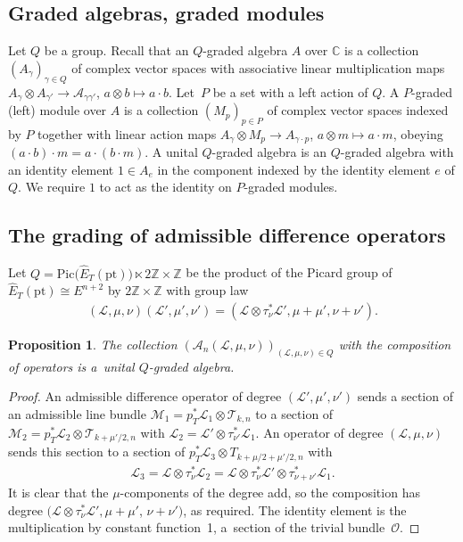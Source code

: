 \documentclass[10pt,a4paper]{amsart}
\numberwithin{equation}{section}
\newtheorem{Proposition}[Theorem]{Proposition}
 { \theoremstyle{definition}
\newtheorem{Definition}[Theorem]{Definition}
\newtheorem{Example}[Theorem]{Example}
\newtheorem{Remark}[Theorem]{Remark} }
\begin{document}
\subsection{Graded algebras, graded modules}
Let $Q$ be a group. Recall that an $Q$-graded algebra $A$ over $\mathbb C$ is a collection $(A_\gamma)_{\gamma\in Q}$ of complex vector spaces with associative linear multiplication maps $A_\gamma\otimes A_{\gamma'}\to\mathcal A_{\gamma\gamma'}$, $a\otimes b\mapsto a\cdot b$. Let~$P$ be a set with a left action of $Q$. A $P$-graded (left) module over $A$ is a collection $(M_p)_{p\in P}$ of complex vector spaces indexed by $P$ together with linear action maps $A_\gamma\otimes M_p\to A_{\gamma\cdot p}$, $a\otimes m\mapsto a\cdot m$, obeying $(a\cdot b)\cdot m=a\cdot(b\cdot m)$. A unital $Q$-graded algebra is an $Q$-graded algebra with an identity element $1\in A_e$ in the component indexed by the identity element $e$ of $Q$. We require $1$ to act as the identity on $P$-graded modules.

\subsection{The grading of admissible difference operators}
Let $Q=\mathrm{Pic}\big(\hat E_T(\mathrm{pt})\big)\ltimes 2\mathbb Z\times \mathbb Z$ be the product of the Picard group of $\hat E_T(\mathrm{pt})\cong E^{n+2}$ by $2\mathbb Z\times \mathbb Z$ with group law
\begin{gather*}
 (\mathcal L,\mu,\nu)(\mathcal L',\mu',\nu') =(\mathcal L\otimes \tau^*_\nu \mathcal L', \mu+\mu',\nu+\nu').
\end{gather*}
\begin{Proposition} The collection $(\mathcal A_n(\mathcal L,\mu,\nu))_{(\mathcal L,\mu,\nu)\in Q}$ with the composition of operators is a~unital $Q$-graded algebra.
\end{Proposition}
\begin{proof} An admissible difference operator of degree $(\mathcal L',\mu',\nu')$ sends a section of an admissible line bundle $\mathcal M_1=p_T^*\mathcal L_1\otimes\mathcal T_{k,n}$ to a section of $\mathcal M_2=p_T^*\mathcal L_2\otimes\mathcal T_{k+\mu'/2,n}$ with $\mathcal L_2=\mathcal L'\otimes\tau^*_{\nu'}\mathcal L_1$. An operator of degree $(\mathcal L,\mu,\nu)$ sends this section to a section of $p_T^*\mathcal L_3\otimes T_{k+\mu/2+\mu'/2,n}$ with
 \begin{gather*}
 \mathcal L_3=\mathcal L\otimes \tau^*_{\nu}\mathcal L_2 =\mathcal L\otimes \tau_{\nu}^*\mathcal L'\otimes\tau^*_{\nu+\nu'}\mathcal L_1.
 \end{gather*}
It is clear that the $\mu$-components of the degree add, so the composition has degree $(\mathcal L\otimes\tau_\nu^*\mathcal L',\mu+\mu'$, $\nu+\nu')$, as required. The identity element is the multiplication by constant function~1, a~section of the trivial bundle~$\mathcal O$.
\end{proof}
\end{document}
